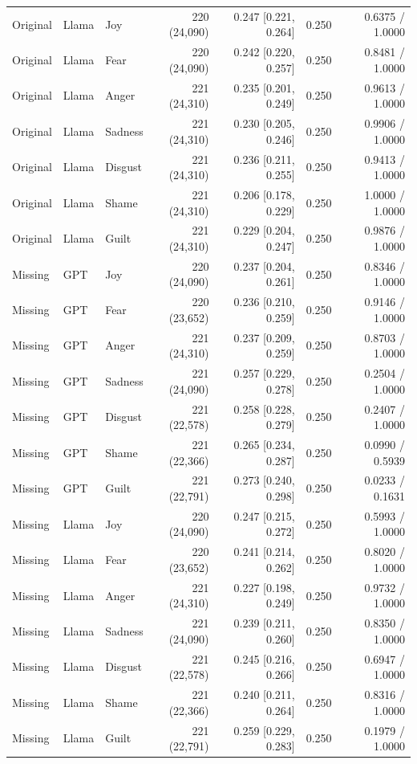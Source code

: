 \begin{table}[t]
{\begin{tabular}{lllrrrr}
Original & Llama & Joy & 220 (24,090) & 0.247 [0.221, 0.264] & 0.250 & 0.6375 / 1.0000 \\
Original & Llama & Fear & 220 (24,090) & 0.242 [0.220, 0.257] & 0.250 & 0.8481 / 1.0000 \\
Original & Llama & Anger & 221 (24,310) & 0.235 [0.201, 0.249] & 0.250 & 0.9613 / 1.0000 \\
Original & Llama & Sadness & 221 (24,310) & 0.230 [0.205, 0.246] & 0.250 & 0.9906 / 1.0000 \\
Original & Llama & Disgust & 221 (24,310) & 0.236 [0.211, 0.255] & 0.250 & 0.9413 / 1.0000 \\
Original & Llama & Shame & 221 (24,310) & 0.206 [0.178, 0.229] & 0.250 & 1.0000 / 1.0000 \\
Original & Llama & Guilt & 221 (24,310) & 0.229 [0.204, 0.247] & 0.250 & 0.9876 / 1.0000 \\
Missing & GPT & Joy & 220 (24,090) & 0.237 [0.204, 0.261] & 0.250 & 0.8346 / 1.0000 \\
Missing & GPT & Fear & 220 (23,652) & 0.236 [0.210, 0.259] & 0.250 & 0.9146 / 1.0000 \\
Missing & GPT & Anger & 221 (24,310) & 0.237 [0.209, 0.259] & 0.250 & 0.8703 / 1.0000 \\
Missing & GPT & Sadness & 221 (24,090) & 0.257 [0.229, 0.278] & 0.250 & 0.2504 / 1.0000 \\
Missing & GPT & Disgust & 221 (22,578) & 0.258 [0.228, 0.279] & 0.250 & 0.2407 / 1.0000 \\
Missing & GPT & Shame & 221 (22,366) & 0.265 [0.234, 0.287] & 0.250 & 0.0990 / 0.5939 \\
Missing & GPT & Guilt & 221 (22,791) & 0.273 [0.240, 0.298] & 0.250 & 0.0233 / 0.1631 \\
Missing & Llama & Joy & 220 (24,090) & 0.247 [0.215, 0.272] & 0.250 & 0.5993 / 1.0000 \\
Missing & Llama & Fear & 220 (23,652) & 0.241 [0.214, 0.262] & 0.250 & 0.8020 / 1.0000 \\
Missing & Llama & Anger & 221 (24,310) & 0.227 [0.198, 0.249] & 0.250 & 0.9732 / 1.0000 \\
Missing & Llama & Sadness & 221 (24,090) & 0.239 [0.211, 0.260] & 0.250 & 0.8350 / 1.0000 \\
Missing & Llama & Disgust & 221 (22,578) & 0.245 [0.216, 0.266] & 0.250 & 0.6947 / 1.0000 \\
Missing & Llama & Shame & 221 (22,366) & 0.240 [0.211, 0.264] & 0.250 & 0.8316 / 1.0000 \\
Missing & Llama & Guilt & 221 (22,791) & 0.259 [0.229, 0.283] & 0.250 & 0.1979 / 1.0000 \\
\bottomrule
\end{tabular}
}
\end{table}


